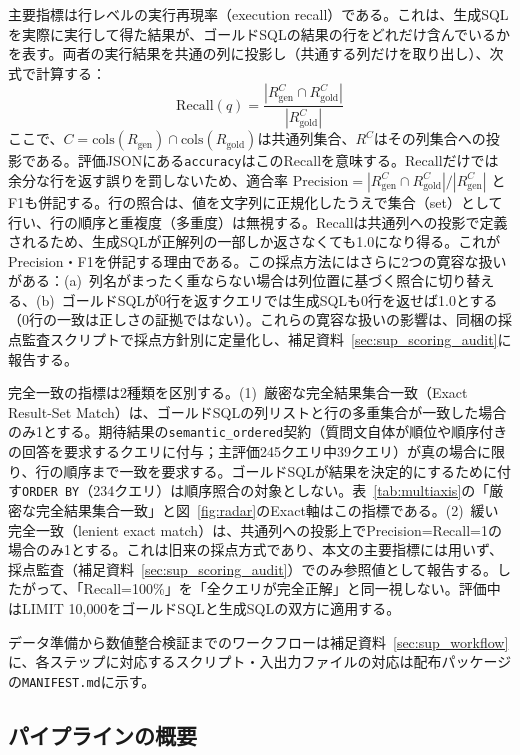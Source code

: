 \documentclass[twocolumn]{interact}
\begin{document}
主要指標は行レベルの実行再現率（execution recall）である。これは、生成SQLを実際に実行して得た結果が、ゴールドSQLの結果の行をどれだけ含んでいるかを表す。両者の実行結果を共通の列に投影し（共通する列だけを取り出し）、次式で計算する：
\begin{equation}
  \mathrm{Recall}(q) = \frac{|R_\text{gen}^{C} \cap R_\text{gold}^{C}|}{|R_\text{gold}^{C}|}
  \label{eq:column_aware}
\end{equation}
ここで、$C = \text{cols}(R_\text{gen}) \cap \text{cols}(R_\text{gold})$は共通列集合、$R^C$はその列集合への投影である。評価JSONにある\texttt{accuracy}はこのRecallを意味する。Recallだけでは余分な行を返す誤りを罰しないため、適合率 $\mathrm{Precision}=|R_\text{gen}^{C}\cap R_\text{gold}^{C}|/|R_\text{gen}^{C}|$ とF1も併記する。行の照合は、値を文字列に正規化したうえで集合（set）として行い、行の順序と重複度（多重度）は無視する。Recallは共通列への投影で定義されるため、生成SQLが正解列の一部しか返さなくても1.0になり得る。これがPrecision・F1を併記する理由である。この採点方法にはさらに2つの寛容な扱いがある：(a)~列名がまったく重ならない場合は列位置に基づく照合に切り替える、(b)~ゴールドSQLが0行を返すクエリでは生成SQLも0行を返せば1.0とする（0行の一致は正しさの証拠ではない）。これらの寛容な扱いの影響は、同梱の採点監査スクリプトで採点方針別に定量化し、補足資料~\ref{sec:sup_scoring_audit}に報告する。

完全一致の指標は2種類を区別する。(1)~厳密な完全結果集合一致（Exact Result-Set Match）は、ゴールドSQLの列リストと行の多重集合が一致した場合のみ1とする。期待結果の\texttt{semantic\_ordered}契約（質問文自体が順位や順序付きの回答を要求するクエリに付与；主評価245クエリ中39クエリ）が真の場合に限り、行の順序まで一致を要求する。ゴールドSQLが結果を決定的にするために付す\texttt{ORDER BY}（234クエリ）は順序照合の対象としない。表~\ref{tab:multiaxis}の「厳密な完全結果集合一致」と図~\ref{fig:radar}のExact軸はこの指標である。(2)~緩い完全一致（lenient exact match）は、共通列への投影上でPrecision=Recall=1の場合のみ1とする。これは旧来の採点方式であり、本文の主要指標には用いず、採点監査（補足資料~\ref{sec:sup_scoring_audit}）でのみ参照値として報告する。したがって、「Recall=100\%」を「全クエリが完全正解」と同一視しない。評価中はLIMIT 10{,}000をゴールドSQLと生成SQLの双方に適用する。

データ準備から数値整合検証までのワークフローは補足資料~\ref{sec:sup_workflow}に、各ステップに対応するスクリプト・入出力ファイルの対応は配布パッケージの\texttt{MANIFEST.md}に示す。

\subsection{パイプラインの概要}
\end{document}
